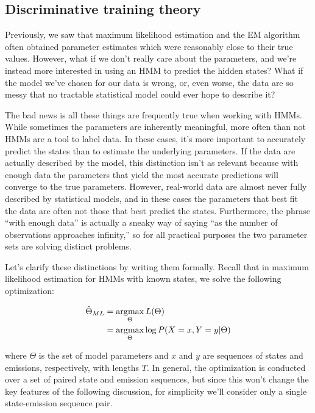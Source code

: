 \subsection{Discriminative training theory}

Previously, we saw that maximum likelihood estimation and the EM algorithm often obtained parameter estimates which were reasonably close to their true values. However, what if we don't really care about the parameters, and we're instead more interested in using an HMM to predict the hidden states? What if the model we've chosen for our data is wrong, or, even worse, the data are so messy that no tractable statistical model could ever hope to describe it?

The bad news is all these things are frequently true when working with HMMs. While sometimes the parameters are inherently meaningful, more often than not HMMs are a tool to label data. In these cases, it's more important to accurately predict the states than to estimate the underlying parameters. If the data are actually described by the model, this distinction isn't as relevant because with enough data the parameters that yield the most accurate predictions will converge to the true parameters. However, real-world data are almost never fully described by statistical models, and in these cases the parameters that best fit the data are often not those that best predict the states. Furthermore, the phrase ``with enough data'' is actually a sneaky way of saying ``as the number of observations approaches infinity,'' so for all practical purposes the two parameter sets are solving distinct problems.

Let's clarify these distinctions by writing them formally. Recall that in maximum likelihood estimation for HMMs with known states, we solve the following optimization:

\begin{align*}
\hat{\Theta}_{ML}
&= \operatorname*{arg\!\max}_\Theta L(\Theta) \\
&= \operatorname*{arg\!\max}_\Theta \log P(X=x, Y=y|\Theta) \\
\end{align*}

where $\Theta$ is the set of model parameters and $x$ and $y$ are sequences of states and emissions, respectively, with lengths $T$. In general, the optimization is conducted over a set of paired state and emission sequences, but since this won't change the key features of the following discussion, for simplicity we'll consider only a single state-emission sequence pair.

